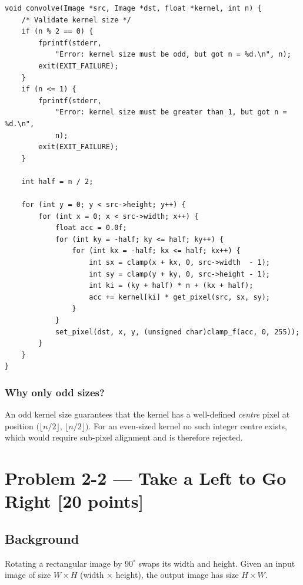 \documentclass[12pt,a4paper]{article}
\begin{document}
\begin{lstlisting}
void convolve(Image *src, Image *dst, float *kernel, int n) {
    /* Validate kernel size */
    if (n % 2 == 0) {
        fprintf(stderr,
            "Error: kernel size must be odd, but got n = %d.\n", n);
        exit(EXIT_FAILURE);
    }
    if (n <= 1) {
        fprintf(stderr,
            "Error: kernel size must be greater than 1, but got n = %d.\n",
            n);
        exit(EXIT_FAILURE);
    }

    int half = n / 2;

    for (int y = 0; y < src->height; y++) {
        for (int x = 0; x < src->width; x++) {
            float acc = 0.0f;
            for (int ky = -half; ky <= half; ky++) {
                for (int kx = -half; kx <= half; kx++) {
                    int sx = clamp(x + kx, 0, src->width  - 1);
                    int sy = clamp(y + ky, 0, src->height - 1);
                    int ki = (ky + half) * n + (kx + half);
                    acc += kernel[ki] * get_pixel(src, sx, sy);
                }
            }
            set_pixel(dst, x, y, (unsigned char)clamp_f(acc, 0, 255));
        }
    }
}
\end{lstlisting}

\subsubsection*{Why only odd sizes?}
An odd kernel size guarantees that the kernel has a well-defined
\emph{centre} pixel at position \(\bigl(\lfloor n/2\rfloor,\,
\lfloor n/2\rfloor\bigr)\).
For an even-sized kernel no such integer centre exists, which would require
sub-pixel alignment and is therefore rejected.

\newpage

\section{Problem 2-2 — Take a Left to Go Right \textnormal{[20 points]}}

\subsection*{Background}
Rotating a rectangular image by $90^\circ$ swaps its width and height.
Given an input image of size \(W \times H\) (width \(\times\) height), the
output image has size \(H \times W\).

\end{document}
